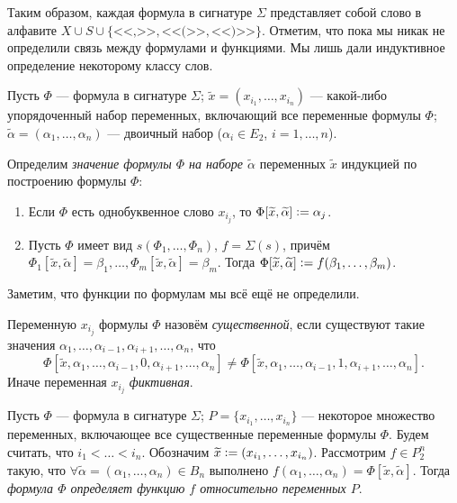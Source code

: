 Таким образом, каждая формула в сигнатуре $\Sigma$ представляет собой слово в алфавите $X \cup S \cup \{\text{<<,>>}, \text{<<(>>}, \text{<<)>>}\}$. Отметим, что пока мы никак не определили связь между формулами и функциями. Мы лишь дали индуктивное определение некоторому классу слов.

Пусть $\Phi$ --- формула в сигнатуре $\Sigma$; $\widetilde{x} = (x_{i_1}, \ldots, x_{i_n})$ --- какой-либо упорядоченный набор переменных, включающий все переменные формулы $\Phi$; $\widetilde{\alpha} = (\alpha_1, \ldots, \alpha_n)$ --- двоичный набор ($\alpha_i \in E_2$, $i = 1, \ldots, n$).

\begin{definition}
    Определим \textit{значение формулы $\Phi$ на наборе $\widetilde{\alpha}$} переменных $\widetilde{x}$ индукцией по построению формулы $\Phi$:
    \begin{enumerate}[nolistsep]
        \item Если $\Phi$ есть однобуквенное слово $x_{i_j}$, то $\Phi[\widetilde{x}, \widetilde{\alpha}] \vcentcolon = \alpha_j$.
        \item Пусть $\Phi$ имеет вид $s(\Phi_1, \ldots, \Phi_n)$, $f = \Sigma(s)$, причём $\Phi_1[\widetilde{x}, \widetilde{\alpha}] = \beta_1, \ldots, \Phi_m[\widetilde{x}, \widetilde{\alpha}] = \beta_m$. Тогда $\Phi[\widetilde{x}, \widetilde{\alpha}] \vcentcolon = f(\beta_1, \ldots, \beta_m)$.
    \end{enumerate}
\end{definition}

Заметим, что функции по формулам мы всё ещё не определили.

\begin{definition}
    Переменную $x_{i_j}$ формулы $\Phi$ назовём \textit{существенной}, если существуют такие значения $\alpha_1, \ldots, \alpha_{i - 1}, \alpha_{i + 1}, \ldots, \alpha_n$, что
    \[
        \Phi[\widetilde{x}, \alpha_1, \ldots, \alpha_{i - 1}, 0, \alpha_{i + 1}, \ldots, \alpha_n] \ne \Phi[\widetilde{x}, \alpha_1, \ldots, \alpha_{i - 1}, 1, \alpha_{i + 1}, \ldots, \alpha_n].
    \]
    Иначе переменная $x_{i_j}$ \textit{фиктивная}.
\end{definition}

\begin{definition}
    Пусть $\Phi$ --- формула в сигнатуре $\Sigma$; $P = \{x_{i_1}, \ldots, x_{i_n}\}$ --- некоторое множество переменных, включающее все существенные переменные формулы $\Phi$. Будем считать, что $i_1 < \ldots < i_n$. Обозначим $\widetilde{x} \vcentcolon = (x_{i_1}, \ldots, x_{i_n})$. Рассмотрим $f \in P_2^n$ такую, что $\forall \widetilde{\alpha} = (\alpha_1, \ldots, \alpha_n) \in B_n$ выполнено $f(\alpha_1, \ldots, \alpha_n) = \Phi[\widetilde{x}, \widetilde{\alpha}]$. Тогда \textit{формула $\Phi$ определяет функцию $f$ относительно переменных $P$}.
\end{definition}

